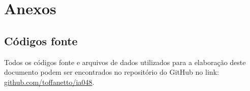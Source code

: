 \thispagestyle{plain}
\section*{Anexos}

\subsection*{Códigos fonte}

Todos os códigos fonte e arquivos de dados utilizados para a elaboração deste documento podem ser encontrados no repositório do GitHub no link: \href{https://github.com/toffanetto/ia048/tree/main/2-Classification}{\color{blue}github.com/toffanetto/ia048}.

